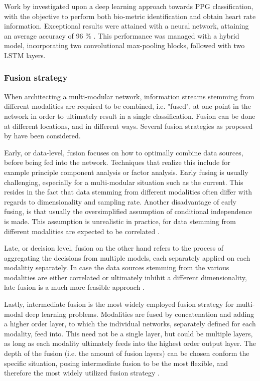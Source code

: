 \documentclass[12pt]{article}
\begin{document}
Work by  investigated upon a deep learning approach towards PPG classification, with the objective to perform both bio-metric identification and obtain heart rate information. Exceptional results were attained with a neural network, attaining an average accuracy of 96 \% \cite{biswas2019cornet}. This performance was managed with a hybrid model, incorporating two convolutional max-pooling blocks, followed with two LSTM layers. 

\subsubsection{Fusion strategy}  
When architecting a multi-modular network, information streams stemming from different modalities are required to be combined, i.e. "fused", at one point in the network in order to ultimately result in a single classification. Fusion can be done at different locations, and in different ways. Several fusion strategies as proposed by  have been considered.

Early, or data-level, fusion focuses on how to optimally combine data sources, before being fed into the network. Techniques that realize this include for example principle component analysis or factor analysis. Early fusing is usually challenging, especially for a multi-modular situation such as the current. This resides in the fact that data stemming from different modalities often differ with regards to dimensionality and sampling rate. Another disadvantage of early fusing, is that usually the oversimplified assumption of conditional independence is made. This assumption is unrealistic in practice, for data stemming from different modalities are expected to be correlated \cite{ramachandram2017deep}. 

Late, or decision level, fusion on the other hand refers to the process of aggregating the decisions from multiple models, each separately applied on each modalitiy separately. In case the data sources stemming from the various modalities are either correlated or ultimately inhibit a different dimensionality, late fusion is a much more feasible approach \cite{ramachandram2017deep}.

Lastly, intermediate fusion is the most widely employed fusion strategy for multi-modal deep learning problems. Modalities are fused by concatenation and adding a higher order layer, to which the individual networks, separately defined for each modality, feed into. This need not be a single layer, but could be multiple layers, as long as each modality ultimately feeds into the highest order output layer. The depth of the fusion (i.e. the amount of fusion layers) can be chosen conform the specific situation, posing intermediate fusion to be the most flexible, and therefore the most widely utilized fusion strategy \cite{ramachandram2017deep}.
\end{document}
